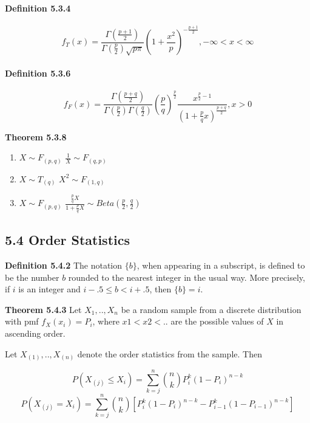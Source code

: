 \documentclass[6pt,Portrait]{article}
\let\oldparagraph\paragraph
\renewcommand{\paragraph}[1]{\oldparagraph{#1}\mbox{}}
\begin{document}
\hypertarget{T}{%
\paragraph{\texorpdfstring{\textbf{Definition
5.3.4}}{Definition 5.3.4}}\label{T}}

\[f_{T}(x)=\frac{\Gamma(\frac{p+1}2)}{\Gamma(\frac{p}2)\sqrt{p\pi}}\left (1+\frac{x^2}{p}\right)^{-\frac{p+1}2},-\infty<x<\infty\]

\hypertarget{F}{%
\paragraph{\texorpdfstring{\textbf{Definition
5.3.6}}{Definition 5.3.6}}\label{F}}

\[f_{F}(x)=\frac{\Gamma(\frac{p+q}2)}{\Gamma(\frac{p}2)\Gamma (\frac{q}2)}(\frac{p}q)^{\frac{p}2}\frac{x^{\frac{p}2-1}}{(1+\frac{p}qx)^{\frac{p+q}2}}, x>0\]

\textbf{Theorem 5.3.8}

\begin{enumerate}
\def\labelenumi{\alph{enumi}.}
\item
  \(X\sim F_(p,q)\) \(\frac{1}X \sim F_(q,p)\)
\item
  \(X\sim T_(q)\) \(X^2 \sim F_(1,q)\)
\item
  \(X\sim F_(p,q)\)
  \(\frac{\frac{p}{q}X}{1+\frac{p}{q}X} \sim Beta(\frac{p}2,\frac{q}2)\)
\end{enumerate}

\hypertarget{order}{%
\subsection{5.4 Order Statistics}\label{order}}

\textbf{Definition 5.4.2} The notation \(\{b\}\), when appearing in a
subscript, is defined to be the number \(b\) rounded to the nearest
integer in the usual way. More precisely, if \(i\) is an integer and
\(i-.5\le b<i+.5\), then \(\{b\}=i\).

\textbf{Theorem 5.4.3} Let \(X_1,..,X_n\) be a random sample from a
discrete distribution with pmf \(f_X(x_i)=P_i\), where \(x1<x2<..\) are
the possible values of \(X\) in ascending order.

Let \(X_{(1)},..,X_{(n)}\) denote the order statistics from the sample.
Then

\[P(X_{(j)}\le X_i)=\sum^n_{k=j}\binom{n}{k}P^k_i(1-P_i)^{n-k}\]
\[P(X_{(j)}=X_i)=\sum^n_{k=j}\binom{n}{k}[P^k_i(1-P_i)^{n-k}-P^k_{i-1}(1-P_{i-1})^{n-k}]\]
\end{document}
